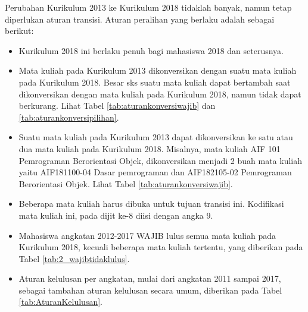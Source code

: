 Perubahan Kurikulum 2013 ke Kurikulum 2018 tidaklah banyak, namun tetap diperlukan aturan transisi. Aturan peralihan yang berlaku adalah sebagai berikut:
\begin{itemize}
	\item Kurikulum 2018 ini berlaku penuh bagi mahasiswa 2018 dan seterusnya.
	\item Mata kuliah pada Kurikulum 2013 dikonversikan dengan suatu mata kuliah pada Kurikulum 2018. Besar sks suatu mata kuliah dapat bertambah saat dikonversikan dengan mata kuliah pada Kurikulum 2018, namun tidak dapat berkurang. Lihat Tabel \ref{tab:aturankonversiwajib} dan \ref{tab:aturankonversipilihan}.
	\item Suatu mata kuliah pada Kurikulum 2013 dapat dikonversikan ke satu atau dua mata kuliah pada Kurikulum 2018. Misalnya, mata kuliah AIF 101 Pemrograman Berorientasi Objek, dikonversikan menjadi 2 buah mata kuliah yaitu AIF181100-04 Dasar pemrograman dan AIF182105-02 Pemrograman Berorientasi Objek. Lihat Tabel \ref{tab:aturankonversiwajib}.
	\item Beberapa mata kuliah harus dibuka untuk tujuan transisi ini. Kodifikasi mata kuliah ini, pada dijit ke-8 diisi dengan angka 9.
	\item Mahasiswa angkatan 2012-2017 WAJIB  lulus semua mata  kuliah pada Kurikulum 2018, kecuali beberapa mata kuliah tertentu, yang diberikan pada Tabel \ref{tab:2_wajibtidaklulus}.
	\item Aturan kelulusan per angkatan, mulai dari angkatan 2011 sampai 2017, sebagai tambahan aturan kelulusan secara umum, diberikan pada Tabel \ref{tab:AturanKelulusan}.
\end{itemize}

